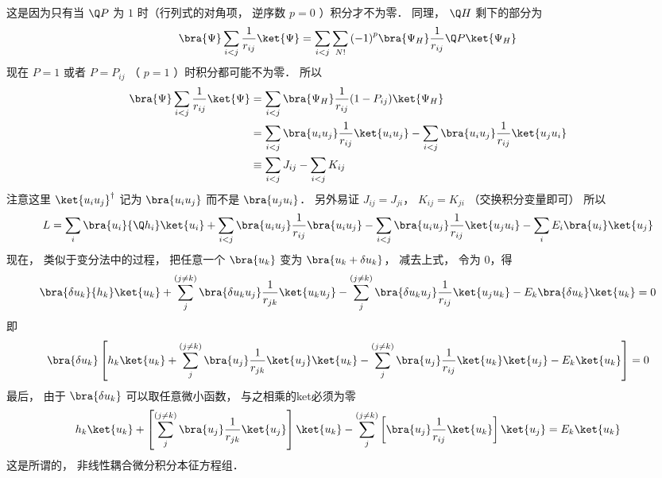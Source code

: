 这是因为只有当 $\Q P$ 为 $1$ 时（行列式的对角项， 逆序数 $p = 0$ ）积分才不为零． 同理， $\Q H$ 剩下的部分为
\begin{equation}
\bra{\Psi}\sum\limits_{i < j} {\frac{1}{{{r_{ij}}}}} \ket{\Psi}  = \sum\limits_{i < j} {\sum\limits_{N!} {{{( - 1)}^p}\bra{\Psi_H}\frac{1}{{{r_{ij}}}}\Q P \ket{{\Psi_H}} } } 
\end{equation}
现在 $P = 1$ 或者 $P = {P_{ij}}$ （ $p=1$ ）时积分都可能不为零． 所以
 \begin{equation}
\begin{aligned}
  \bra{\Psi}\sum\limits_{i < j} {\frac{1}{{{r_{ij}}}}} \ket{\Psi} & = \sum\limits_{i < j} {\bra{\Psi_H}\frac{1}{{{r_{ij}}}}(1 - {P_{ij}}) \ket{{\Psi_H}} }  \\
  &= \sum\limits_{i < j} {\bra{{u_i}{u_j}}\frac{1}{{{r_{ij}}}} \ket{{u_i}{u_j}}}  - \sum\limits_{i < j} {\bra{{u_i}{u_j}}\frac{1}{{{r_{ij}}}} \ket{{u_j}{u_i}} } \\
  & \equiv \sum\limits_{i < j} {{J_{ij}}}  - \sum\limits_{i < j} {{K_{ij}}} \\ 
\end{aligned}
\end{equation}
注意这里 ${ \ket{{u_i}{u_j}} ^\dag }$ 记为 $\bra{{u_i}{u_j}}$ 而不是 $\bra{{u_j}{u_i}}$．  另外易证 ${J_{ij}} = {J_{ji}}$，  ${K_{ij}} = {K_{ji}}$ （交换积分变量即可） 所以
 \begin{equation}
L = \sum\limits_i {\bra{{u_i}}{\Q h_i} \ket{{u_i}} }  + \sum\limits_{i < j} {\bra{{u_i}{u_j}}\frac{1}{{{r_{ij}}}} \bra{{u_i}{u_j}} }  - \sum\limits_{i < j} {\bra{{u_i}{u_j}} \frac{1}{{{r_{ij}}}} \ket{{u_j}{u_i}}  }  - \sum\limits_i {E_i}\bra{u_i}\ket{u_j}
\end{equation}
现在， 类似于变分法中的过程， 把任意一个 $\bra{u_k}$ 变为 $\bra{{u_k} + \delta {u_k}}$，  减去上式， 令为 $0$，得
 \begin{equation}
\bra{\delta {u_k}}{h_k} \ket{{u_k}}  + \sum\limits_j^{(j \ne k)} {\bra{\delta {u_k}{u_j}}\frac{1}{{{r_{jk}}}} \ket{{u_k}{u_j}} }  - \sum\limits_j^{(j \ne k)} {\bra{\delta {u_k}{u_j}}\frac{1}{{{r_{ij}}}}\ket{{u_j}{u_k}} }  - {E_k}\bra{\delta u_k}\ket{u_k}  = 0
\end{equation}
即
 \begin{equation}
\bra{\delta {u_k}}\left[ {{h_k} \ket{{u_k}}  + \sum\limits_j^{(j \ne k)} {\bra{{u_j}} \frac{1}{{{r_{jk}}}} \ket{{u_j}} \ket{{u_k}} }  - \sum\limits_j^{(j \ne k)} {\bra{{u_j}}\frac{1}{{{r_{ij}}}} \ket{{u_k}} \ket{{u_j}} }  - {E_k} \ket{{u_k}} } \right] = 0
\end{equation}
最后， 由于 $\bra{\delta {u_k}}$ 可以取任意微小函数， 与之相乘的ket必须为零
 \begin{equation}
{h_k} \ket{{u_k}}  + \left[ {\sum\limits_j^{(j \ne k)} {\bra{{u_j}}\frac{1}{{{r_{jk}}}} \ket{{u_j}}} } \right] \ket{{u_k}}  - \sum\limits_j^{(j \ne k)} {\left[ {\bra{{u_j}}\frac{1}{{{r_{ij}}}}  \ket{{u_k}}} \right] \ket{{u_j}} }  = {E_k} \ket{{u_k}} 
\end{equation}
这是所谓的， 非线性耦合微分积分本征方程组．

